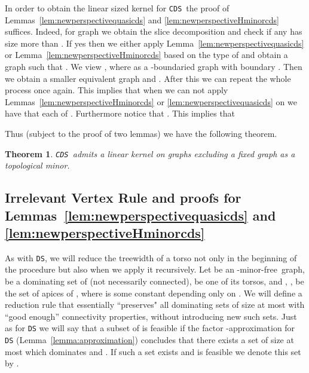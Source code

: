\documentclass[11pt]{article}
\newtheorem{theorem}{Theorem}
\newcommand{\Hmf}{-minor-free}
\newcommand{\tDS}{{\texttt{\sc DS}}}
\newcommand{\tCDS}{{\texttt{\sc CDS}}}
\begin{document}
In order to obtain the linear sized kernel for \tCDS \, the proof of  
 Lemmas~\ref{lem:newperspectivequasicds} and \ref{lem:newperspectiveHminorcds} suffices. 
 Indeed, for  graph  we 
obtain the slice decomposition and check if any   has size more than . If yes then we either apply  
Lemma~\ref{lem:newperspectivequasicds} or Lemma~\ref{lem:newperspectiveHminorcds} based on the type of  
and obtain a graph  such that  . We view 
, where  as a -boundaried graph with 
boundary . Then we obtain  a smaller equivalent graph  and .  After this we can 
repeat the whole process once again. This implies that when we can not apply Lemmas~\ref{lem:newperspectiveHminorcds} or  
\ref{lem:newperspectivequasicds}  on  we have that each of 
.  Furthermore notice that . This implies that  


Thus (subject to the proof of two lemmas) we have the following theorem. 
\begin{theorem}
\label{thm:lineardomsettopocds}
\tCDS \, admits a linear kernel on graphs excluding a fixed graph  as a topological minor. 
\end{theorem}


\subsection{Irrelevant Vertex Rule and proofs for  Lemmas~\ref{lem:newperspectivequasicds} and \ref{lem:newperspectiveHminorcds} }


As with \tDS, we will reduce  the treewidth of a torso not only in the beginning of the procedure but also when we apply it recursively. 
Let  be an \Hmf \,  graph,  be a dominating set of  (not necessarily connected),  be one of its torsos, and , ,  be the set of apices of , where  is some constant depending only on . We will define a reduction rule that essentially ``preserves" all dominating sets of size at most  with ``good enough'' connectivity properties, without introducing new such sets. Just as for \tDS{} we will say that a subset  of  is feasible if the factor -approximation for \tDS{} (Lemma~\ref{lemma:approximation})  concludes that there exists a set  of size 
at most  which   dominates  and . 
If such a set exists and  is feasible we denote this set by . 
\end{document}
